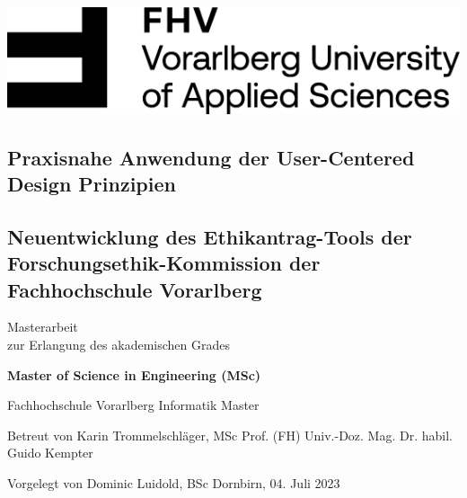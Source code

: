\documentclass[a4paper,12pt,twoside,numbers=noendperiod]{scrreprt}
\begin{document}

\begin{titlepage}
    \begin{flushright}
    \includegraphics[width=0.4\linewidth]{images/FHV_FHV-Logo.png}
    \end{flushright}
    \vspace{1cm}

    \begin{flushleft}
    \section*{Praxisnahe Anwendung der User-Centered Design Prinzipien}
    \subsection*{Neuentwicklung des Ethikantrag-Tools der Forschungsethik-Kommission der Fachhochschule Vorarlberg}
    \vspace{1cm}

    Masterarbeit\\
    zur Erlangung des akademischen Grades
    \vspace{0.5cm}

    \textbf{Master of Science in Engineering (MSc)}

    \vspace{1cm}
    Fachhochschule Vorarlberg\newline
    Informatik Master

    \vspace{0.5cm}

    Betreut von\newline
    Karin Trommelschläger, MSc\newline
    Prof. (FH) Univ.-Doz. Mag. Dr. habil. Guido Kempter

    \vspace{0.5cm}

    Vorgelegt von\newline
    Dominic Luidold, BSc\newline
    Dornbirn, 04. Juli 2023
    \end{flushleft}
\end{titlepage}

\cleardoublepage
{}
\end{document}

